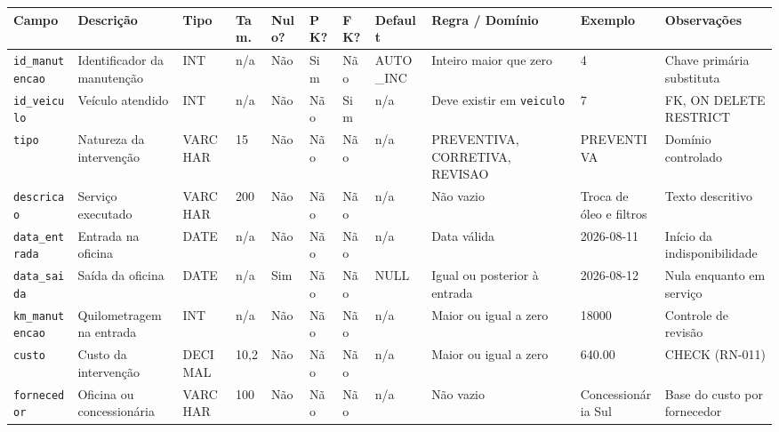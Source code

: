 \begin{table}[!t]
\begin{tabular}{|L{2.15cm}|L{2.7cm}|L{1.15cm}|C{0.62cm}|C{0.62cm}|C{0.5cm}|C{0.5cm}|L{1.45cm}|L{2.6cm}|L{2.0cm}|L{1.85cm}|}
\hline
\textbf{Campo} & \textbf{Descri\c{c}\~ao} & \textbf{Tipo} & \textbf{Tam.} & \textbf{Nulo?} & \textbf{PK?} & \textbf{FK?} & \textbf{Default} & \textbf{Regra / Dom\'inio} & \textbf{Exemplo} & \textbf{Observa\c{c}\~oes} \\
\hline
\texttt{id\_\allowbreak{}manutencao} & Identificador da manuten\c{c}\~ao & INT & n/a & N\~ao & Sim & N\~ao & AUTO\_\allowbreak{}INC & Inteiro maior que zero & 4 & Chave prim\'aria substituta \\
\hline
\texttt{id\_\allowbreak{}veiculo} & Ve\'iculo atendido & INT & n/a & N\~ao & N\~ao & Sim & n/a & Deve existir em \texttt{veiculo} & 7 & FK, ON DELETE RESTRICT \\
\hline
\texttt{tipo} & Natureza da interven\c{c}\~ao & VARCHAR & 15 & N\~ao & N\~ao & N\~ao & n/a & PREVENTIVA, CORRETIVA, REVISAO & PREVENTIVA & Dom\'inio controlado \\
\hline
\texttt{descricao} & Servi\c{c}o executado & VARCHAR & 200 & N\~ao & N\~ao & N\~ao & n/a & N\~ao vazio & Troca de \'oleo e filtros & Texto descritivo \\
\hline
\texttt{data\_\allowbreak{}entrada} & Entrada na oficina & DATE & n/a & N\~ao & N\~ao & N\~ao & n/a & Data v\'alida & 2026-08-11 & In\'icio da indisponibilidade \\
\hline
\texttt{data\_\allowbreak{}saida} & Sa\'ida da oficina & DATE & n/a & Sim & N\~ao & N\~ao & NULL & Igual ou posterior \`a entrada & 2026-08-12 & Nula enquanto em servi\c{c}o \\
\hline
\texttt{km\_\allowbreak{}manutencao} & Quilometragem na entrada & INT & n/a & N\~ao & N\~ao & N\~ao & n/a & Maior ou igual a zero & 18000 & Controle de revis\~ao \\
\hline
\texttt{custo} & Custo da interven\c{c}\~ao & DECIMAL & 10,2 & N\~ao & N\~ao & N\~ao & n/a & Maior ou igual a zero & 640.00 & CHECK (RN-011) \\
\hline
\texttt{fornecedor} & Oficina ou concession\'aria & VARCHAR & 100 & N\~ao & N\~ao & N\~ao & n/a & N\~ao vazio & Concession\'aria Sul & Base do custo por fornecedor \\
\hline
\end{tabular}
\end{table}

